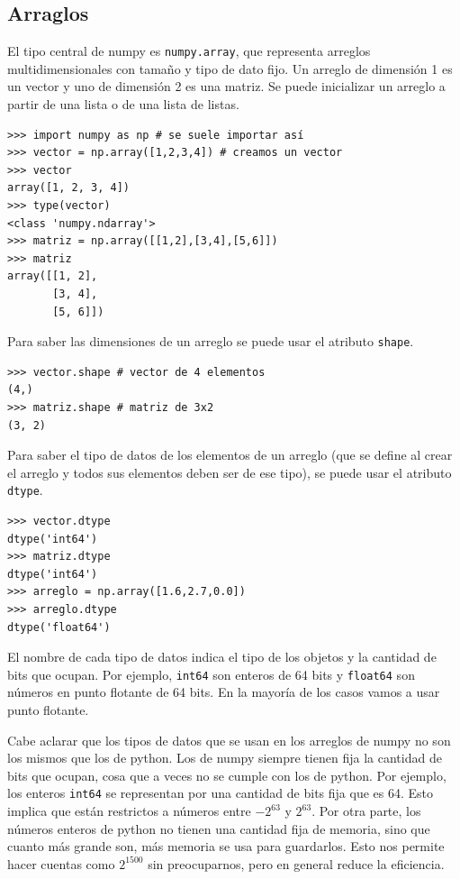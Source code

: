 \documentclass[a4paper, 12pt]{report}
\theoremstyle{definition}
\begin{document}
\subsection{Arraglos}

El tipo central  de numpy es {\tt numpy.array}, que representa arreglos multidimensionales con tamaño y tipo de dato fijo. Un arreglo de dimensión 1 es un vector y uno de dimensión 2 es una matriz. Se puede inicializar un arreglo a partir de una lista o de una lista de listas.
\begin{verbatim}
>>> import numpy as np # se suele importar así
>>> vector = np.array([1,2,3,4]) # creamos un vector
>>> vector
array([1, 2, 3, 4])
>>> type(vector)
<class 'numpy.ndarray'>
>>> matriz = np.array([[1,2],[3,4],[5,6]])
>>> matriz
array([[1, 2],
       [3, 4],
       [5, 6]])
\end{verbatim}
Para saber las dimensiones de un arreglo se puede usar el atributo {\tt shape}.
\begin{verbatim}
>>> vector.shape # vector de 4 elementos
(4,)
>>> matriz.shape # matriz de 3x2
(3, 2)
\end{verbatim}
Para saber el tipo de datos de los elementos de un arreglo (que se define al crear el arreglo y todos sus elementos deben ser de ese tipo), se  puede usar el atributo {\tt dtype}.
\begin{verbatim}
>>> vector.dtype
dtype('int64')
>>> matriz.dtype
dtype('int64')
>>> arreglo = np.array([1.6,2.7,0.0])
>>> arreglo.dtype
dtype('float64')
\end{verbatim}
El nombre de cada tipo de datos indica el tipo de los objetos y la cantidad de bits que ocupan. Por ejemplo, {\tt int64} son enteros de 64 bits y {\tt float64} son números en punto flotante de 64 bits. En la mayoría de los casos vamos a usar punto flotante.

Cabe aclarar que los tipos de datos que se usan en los arreglos de numpy no son los mismos que los de python. Los de numpy siempre tienen fija la cantidad de bits que ocupan, cosa que a veces no se cumple con los de python. Por ejemplo, los enteros {\tt int64} se representan por una cantidad de bits fija que es 64. Esto implica que están restrictos a números entre $-2^{63}$ y $2^{63}$. Por otra parte, los números enteros de python no tienen una cantidad fija de memoria, sino que cuanto más grande son, más memoria se usa para guardarlos. Esto nos permite hacer cuentas como $2^{1500}$ sin preocuparnos, pero en general reduce la eficiencia.
\end{document}
